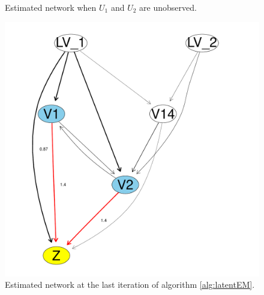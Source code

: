 \documentclass[letterpaper]{article}
\begin{document}
\begin{figure}[ht!]
\begin{minipage}[t]{0.33\linewidth}
     \caption{\label{fig_missing} Estimated network when $U_1$ and
      $U_2$ are unobserved.}
   \end{minipage}\hfill
   \begin{minipage}[t]{0.33\linewidth }
    \includegraphics[width=\linewidth]{./images/estimated_network_infered.pdf}
    \caption{\label{fig_estnet_infered} Estimated network at the last
      iteration of algorithm \ref{alg:latentEM}.}
  \end{minipage}
\end{figure}
\end{document}
